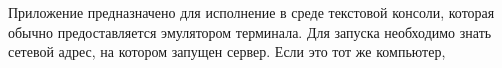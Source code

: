 
Приложение предназначено для исполнение в среде текстовой консоли, которая обычно
предоставляется эмулятором терминала. Для запуска необходимо знать
сетевой адрес, на котором запущен сервер. Если это тот же компьютер,

\clearpage
